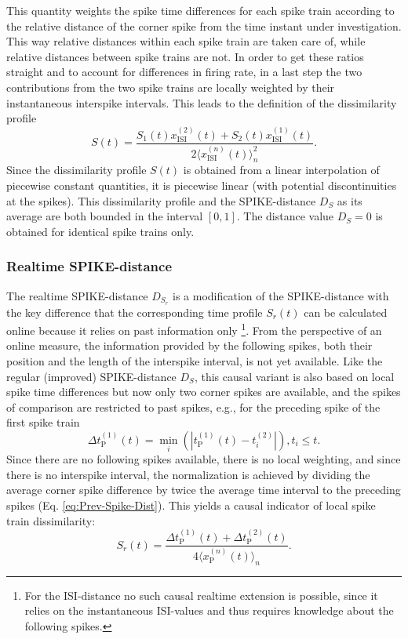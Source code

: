 \documentclass[10pt,twocolumn]{elsart5p}
\begin{document}
This quantity weights the spike time differences for each spike train according to the relative distance of the corner spike from the time instant under investigation. This way relative distances within each spike train are taken care of, while relative distances between spike trains are not. In order to get these ratios straight and to account for differences in firing rate, in a last step the two contributions from the two spike trains are locally weighted by their instantaneous interspike intervals. This leads to the definition of the dissimilarity profile
%
\begin{equation} \label{eq:Bi-Spike-Diss-Improved}
     S (t) = \frac{S_1 (t) x_{\mathrm {ISI}}^{(2)} (t) + S_2 (t) x_{\mathrm {ISI}}^{(1)} (t)}{2 \langle x_{\mathrm {ISI}}^{(n)} (t) \rangle_n^2}.
\end{equation}
%
Since the dissimilarity profile $S (t)$ is obtained from a linear interpolation of piecewise constant quantities, it is piecewise linear (with potential discontinuities at the spikes). This dissimilarity profile and the SPIKE-distance $D_S$ as its average are both bounded in the interval $[0, 1]$. The distance value $D_S = 0$ is obtained for identical spike trains only.



\subsubsection{\label{sss:Realtime-Spike-Distance} Realtime SPIKE-distance}

The realtime SPIKE-distance $D_{S_r}$ is a modification of the SPIKE-distance with the key difference that the corresponding time profile $S_r(t)$ can be calculated online because it relies on past information only \footnote{For the ISI-distance no such causal realtime extension is possible, since it relies on the instantaneous ISI-values and thus requires knowledge about the following spikes.}. From the perspective of an online measure, the information provided by the following spikes, both their position and the length of the interspike interval, is not yet available. Like the regular (improved) SPIKE-distance $D_S$, this causal variant is also based on local spike time differences but now only two corner spikes are available, and the spikes of comparison are restricted to past spikes, e.g., for the preceding spike of the first spike train
%
\begin{equation} \label{eq:Delta-Corner-Spike-Realtime}
     \Delta t_{\mathrm {P}}^{(1)} (t) = \min_i (| t_{\mathrm {P}}^{(1)} (t) - t_i^{(2)} |), t_i \leq t.
\end{equation}
%
Since there are no following spikes available, there is no local weighting, and since there is no interspike interval, the normalization is achieved by dividing the average corner spike difference by twice the average time interval to the preceding spikes (Eq. \ref{eq:Prev-Spike-Dist}). This yields a causal indicator of local spike train dissimilarity:
%
\begin{equation} \label{eq:Bi-Spike-Diss-RT}
    S_r (t) = \frac{ \Delta t_{\mathrm {P}}^{(1)} (t) + \Delta t_{\mathrm {P}}^{(2)} (t)} {4 \langle x_{\mathrm {P}}^{(n)} (t) \rangle_n}.
\end{equation}
\end{document}
